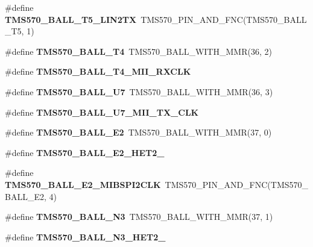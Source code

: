 \begin{DoxyCompactItemize}
\item 
\mbox{\label{tms570lc4357-pins_8h_a7a0e39ae092e5549021e713747e20f8d}} 
\#define {\bfseries T\+M\+S570\+\_\+\+B\+A\+L\+L\+\_\+\+T5\+\_\+\+L\+I\+N2\+TX}~T\+M\+S570\+\_\+\+P\+I\+N\+\_\+\+A\+N\+D\+\_\+\+F\+NC(T\+M\+S570\+\_\+\+B\+A\+L\+L\+\_\+\+T5, 1)
\item 
\mbox{\label{tms570lc4357-pins_8h_ac873e8c6835f7d2f88734f652c831d81}} 
\#define {\bfseries T\+M\+S570\+\_\+\+B\+A\+L\+L\+\_\+\+T4}~T\+M\+S570\+\_\+\+B\+A\+L\+L\+\_\+\+W\+I\+T\+H\+\_\+\+M\+MR(36, 2)
\item 
\#define {\bfseries T\+M\+S570\+\_\+\+B\+A\+L\+L\+\_\+\+T4\+\_\+\+M\+I\+I\+\_\+\+R\+X\+C\+LK}
\item 
\mbox{\label{tms570lc4357-pins_8h_a09d0cbf9c3885330456fcc7c736e7e08}} 
\#define {\bfseries T\+M\+S570\+\_\+\+B\+A\+L\+L\+\_\+\+U7}~T\+M\+S570\+\_\+\+B\+A\+L\+L\+\_\+\+W\+I\+T\+H\+\_\+\+M\+MR(36, 3)
\item 
\#define {\bfseries T\+M\+S570\+\_\+\+B\+A\+L\+L\+\_\+\+U7\+\_\+\+M\+I\+I\+\_\+\+T\+X\+\_\+\+C\+LK}
\item 
\mbox{\label{tms570lc4357-pins_8h_adc72d7a3d0562e5e5e72b58fa5498404}} 
\#define {\bfseries T\+M\+S570\+\_\+\+B\+A\+L\+L\+\_\+\+E2}~T\+M\+S570\+\_\+\+B\+A\+L\+L\+\_\+\+W\+I\+T\+H\+\_\+\+M\+MR(37, 0)
\item 
\#define {\bfseries T\+M\+S570\+\_\+\+B\+A\+L\+L\+\_\+\+E2\+\_\+\+H\+E\+T2\+\_}
\item 
\mbox{\label{tms570lc4357-pins_8h_a4b35064708c8176396213f6c3c3a1d6c}} 
\#define {\bfseries T\+M\+S570\+\_\+\+B\+A\+L\+L\+\_\+\+E2\+\_\+\+M\+I\+B\+S\+P\+I2\+C\+LK}~T\+M\+S570\+\_\+\+P\+I\+N\+\_\+\+A\+N\+D\+\_\+\+F\+NC(T\+M\+S570\+\_\+\+B\+A\+L\+L\+\_\+\+E2, 4)
\item 
\mbox{\label{tms570lc4357-pins_8h_aef7c561fc1e704f54dc6d0bbb999a0af}} 
\#define {\bfseries T\+M\+S570\+\_\+\+B\+A\+L\+L\+\_\+\+N3}~T\+M\+S570\+\_\+\+B\+A\+L\+L\+\_\+\+W\+I\+T\+H\+\_\+\+M\+MR(37, 1)
\item 
\#define {\bfseries T\+M\+S570\+\_\+\+B\+A\+L\+L\+\_\+\+N3\+\_\+\+H\+E\+T2\+\_}
\item 
\mbox{\label{tms570lc4357-pins_8h_aae969489d1b94a1466d0a03a22d52017}} 

\end{DoxyCompactItemize}
